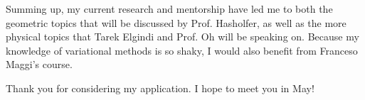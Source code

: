 \documentclass[reqno,12pt,letterpaper]{amsart}
\theoremstyle{definition}
\begin{document}
Summing up, my current research and mentorship have led me to both the geometric topics that will be discussed by Prof. Hasholfer, as well as the more physical topics that Tarek Elgindi and Prof. Oh will be speaking on.
Because my knowledge of variational methods is so shaky, I would also benefit from Franceso Maggi's course.

Thank you for considering my application.
I hope to meet you in May!
\end{document}
